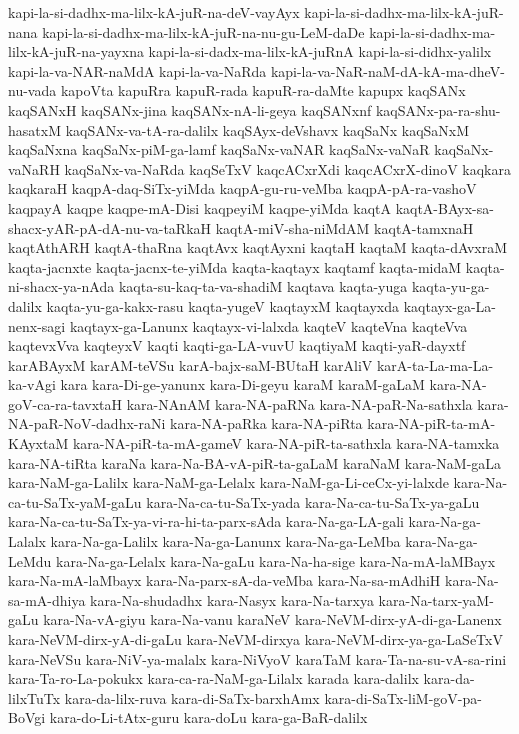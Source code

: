 {kapi-la-si-dadhx-ma-lilx-kA-juR-na-deV-vayAyx
kapi-la-si-dadhx-ma-lilx-kA-juR-nana
kapi-la-si-dadhx-ma-lilx-kA-juR-na-nu-gu-LeM-daDe
kapi-la-si-dadhx-ma-lilx-kA-juR-na-yayxna
kapi-la-si-dadx-ma-lilx-kA-juRnA
kapi-la-si-didhx-yalilx
kapi-la-va-NAR-naMdA
kapi-la-va-NaRda
kapi-la-va-NaR-naM-dA-kA-ma-dheV-nu-vada
kapoVta
kapuRra
kapuR-rada
kapuR-ra-daMte
kapupx
kaqSANx
kaqSANxH
kaqSANx-jina
kaqSANx-nA-li-geya
kaqSANxnf
kaqSANx-pa-ra-shu-hasatxM
kaqSANx-va-tA-ra-dalilx
kaqSAyx-deVshavx
kaqSaNx
kaqSaNxM
kaqSaNxna
kaqSaNx-piM-ga-lamf
kaqSaNx-vaNAR
kaqSaNx-vaNaR
kaqSaNx-vaNaRH
kaqSaNx-va-NaRda
kaqSeTxV
kaqcACxrXdi
kaqcACxrX-dinoV
kaqkara
kaqkaraH
kaqpA-daq-SiTx-yiMda
kaqpA-gu-ru-veMba
kaqpA-pA-ra-vashoV
kaqpayA
kaqpe
kaqpe-mA-Disi
kaqpeyiM
kaqpe-yiMda
kaqtA
kaqtA-BAyx-sa-shacx-yAR-pA-dA-nu-va-taRkaH
kaqtA-miV-sha-niMdAM
kaqtA-tamxnaH
kaqtAthARH
kaqtA-thaRna
kaqtAvx
kaqtAyxni
kaqtaH
kaqtaM
kaqta-dAvxraM
kaqta-jacnxte
kaqta-jacnx-te-yiMda
kaqta-kaqtayx
kaqtamf
kaqta-midaM
kaqta-ni-shacx-ya-nAda
kaqta-su-kaq-ta-va-shadiM
kaqtava
kaqta-yuga
kaqta-yu-ga-dalilx
kaqta-yu-ga-kakx-rasu
kaqta-yugeV
kaqtayxM
kaqtayxda
kaqtayx-ga-La-nenx-sagi
kaqtayx-ga-Lanunx
kaqtayx-vi-lalxda
kaqteV
kaqteVna
kaqteVva
kaqtevxVva
kaqteyxV
kaqti
kaqti-ga-LA-vuvU
kaqtiyaM
kaqti-yaR-dayxtf
karABAyxM
karAM-teVSu
karA-bajx-saM-BUtaH
karAliV
karA-ta-La-ma-La-ka-vAgi
kara
kara-Di-ge-yanunx
kara-Di-geyu
karaM
karaM-gaLaM
kara-NA-goV-ca-ra-tavxtaH
kara-NAnAM
kara-NA-paRNa
kara-NA-paR-Na-sathxla
kara-NA-paR-NoV-dadhx-raNi
kara-NA-paRka
kara-NA-piRta
kara-NA-piR-ta-mA-KAyxtaM
kara-NA-piR-ta-mA-gameV
kara-NA-piR-ta-sathxla
kara-NA-tamxka
kara-NA-tiRta
karaNa
kara-Na-BA-vA-piR-ta-gaLaM
karaNaM
kara-NaM-gaLa
kara-NaM-ga-Lalilx
kara-NaM-ga-Lelalx
kara-NaM-ga-Li-ceCx-yi-lalxde
kara-Na-ca-tu-SaTx-yaM-gaLu
kara-Na-ca-tu-SaTx-yada
kara-Na-ca-tu-SaTx-ya-gaLu
kara-Na-ca-tu-SaTx-ya-vi-ra-hi-ta-parx-sAda
kara-Na-ga-LA-gali
kara-Na-ga-Lalalx
kara-Na-ga-Lalilx
kara-Na-ga-Lanunx
kara-Na-ga-LeMba
kara-Na-ga-LeMdu
kara-Na-ga-Lelalx
kara-Na-gaLu
kara-Na-ha-sige
kara-Na-mA-laMBayx
kara-Na-mA-laMbayx
kara-Na-parx-sA-da-veMba
kara-Na-sa-mAdhiH
kara-Na-sa-mA-dhiya
kara-Na-shudadhx
kara-Nasyx
kara-Na-tarxya
kara-Na-tarx-yaM-gaLu
kara-Na-vA-giyu
kara-Na-vanu
karaNeV
kara-NeVM-dirx-yA-di-ga-Lanenx
kara-NeVM-dirx-yA-di-gaLu
kara-NeVM-dirxya
kara-NeVM-dirx-ya-ga-LaSeTxV
kara-NeVSu
kara-NiV-ya-malalx
kara-NiVyoV
karaTaM
kara-Ta-na-su-vA-sa-rini
kara-Ta-ro-La-pokukx
kara-ca-ra-NaM-ga-Lilalx
karada
kara-dalilx
kara-da-lilxTuTx
kara-da-lilx-ruva
kara-di-SaTx-barxhAmx
kara-di-SaTx-liM-goV-pa-BoVgi
kara-do-Li-tAtx-guru
kara-doLu
kara-ga-BaR-dalilx
}
